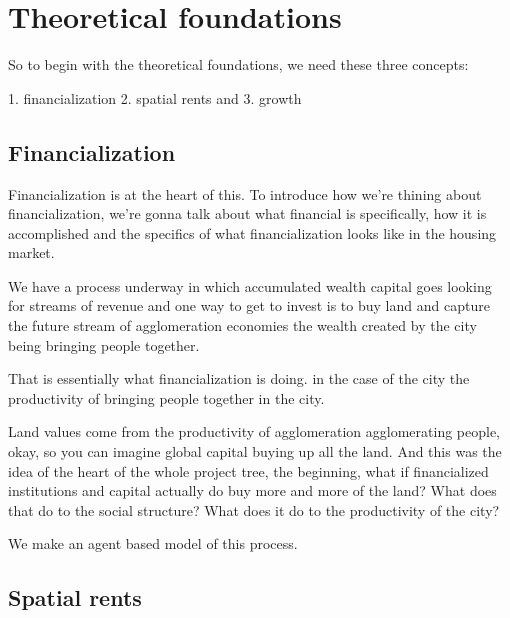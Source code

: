 \section{Theoretical foundations}

So to begin with the theoretical foundations, we need these three concepts: 

1. financialization
2. spatial rents and
3. growth

\subsection{Financialization}



Financialization is at the heart of this. To introduce how we're thining about financialization, we’re gonna talk about what financial is specifically, %
how it is accomplished
and the specifics of what financialization looks like in the housing market.


We have a process underway in which accumulated wealth capital goes looking for streams of revenue and one way to get to invest is to buy land and capture the future stream of agglomeration economies the wealth created by the city being bringing people together.

That is essentially what financialization is doing. %
in the case of the city the productivity of bringing people together in the city. 

Land values come from the productivity of agglomeration agglomerating people, okay, so you can imagine global capital buying up all the land.
And this was the idea of the heart of the whole project tree, the beginning, what if financialized institutions and capital actually do buy more and more of the land? What does that do to the social structure? What does it do to the productivity of the city?

We make an agent based model of this process. 


\subsection{Spatial rents}

